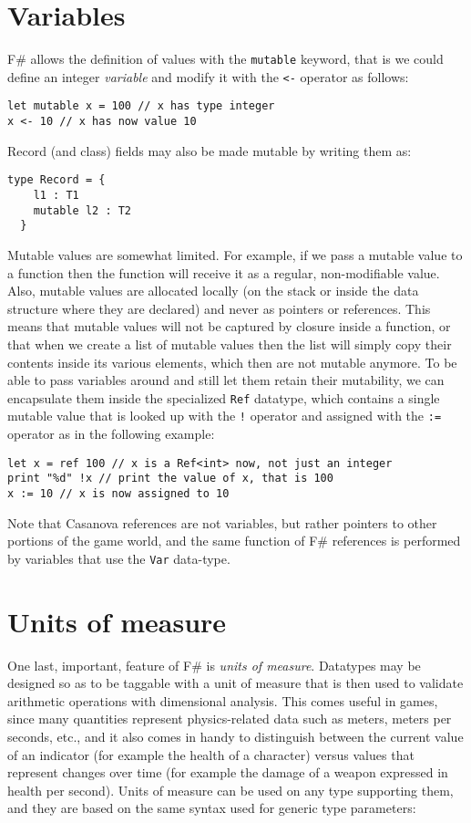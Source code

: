 \section{Variables}
F\# allows the definition of values with the \texttt{mutable} keyword, that is we could define an integer \textit{variable} and modify it with the \texttt{<-} operator as follows:

\begin{lstlisting}
let mutable x = 100 // x has type integer
x <- 10 // x has now value 10
\end{lstlisting}

Record (and class) fields may also be made mutable by writing them as:

\begin{lstlisting}
type Record = {
    l1 : T1
    mutable l2 : T2
  }
\end{lstlisting}

Mutable values are somewhat limited. For example, if we pass a mutable value to a function then the function will receive it as a regular, non-modifiable value. Also, mutable values are allocated locally (on the stack or inside the data structure where they are declared) and never as pointers or references. This means that mutable values will not be captured by closure inside a function, or that when we create a list of mutable values then the list will simply copy their contents inside its various elements, which then are not mutable anymore. To be able to pass variables around and still let them retain their mutability, we can encapsulate them inside the specialized \texttt{Ref} datatype, which contains a single mutable value that is looked up with the \texttt{!} operator and assigned with the \texttt{:=} operator as in the following example:

\begin{lstlisting}
let x = ref 100 // x is a Ref<int> now, not just an integer
print "%d" !x // print the value of x, that is 100
x := 10 // x is now assigned to 10
\end{lstlisting}

Note that Casanova references are not variables, but rather pointers to other portions of the game world, and the same function of F\# references is performed by variables that use the \texttt{Var} data-type.

\section{Units of measure}
One last, important, feature of F\# is \textit{units of measure}. Datatypes may be designed so as to be taggable with a unit of measure that is then used to validate arithmetic operations with dimensional analysis. This comes useful in games, since many quantities represent physics-related data such as meters, meters per seconds, etc., and it also comes in handy to distinguish between the current value of an indicator (for example the health of a character) versus values that represent changes over time (for example the damage of a weapon expressed in health per second). Units of measure can be used on any type supporting them, and they are based on the same syntax used for generic type parameters:

